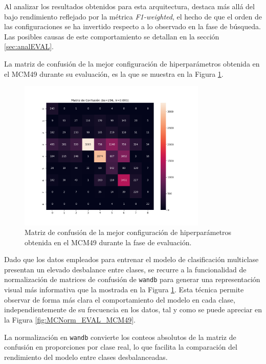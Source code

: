 Al analizar los resultados obtenidos para esta arquitectura, destaca más allá del bajo rendimiento reflejado por la métrica \textit{F1-weighted}, el hecho de que el orden de las configuraciones se ha invertido respecto a lo observado en la fase de búsqueda. Las posibles causas de este comportamiento se detallan en la sección \ref{sec:analEVAL}.



La matriz de confusión de la mejor configuración de hiperparámetros obtenida en el MCM49 durante su evaluación, es la que se muestra en la Figura \ref{fig:MC_EVAL_MCM49}.

\begin{figure}[H]
    \centering
    \includegraphics[width=0.8\textwidth]{./img/evaluacion/matrices_confusion/MC_EVAL_MCM49.png}
    \caption{Matriz de confusión de la mejor configuración de hiperparámetros obtenida en el MCM49 durante la fase de evaluación.}
    \label{fig:MC_EVAL_MCM49}
\end{figure}

Dado que los datos empleados para entrenar el modelo de clasificación multiclase presentan un elevado desbalance entre clases, se recurre a la funcionalidad de normalización de matrices de confusión de \texttt{wandb} para generar una representación visual más informativa que la mostrada en la Figura \ref{fig:MC_EVAL_MCM49}. Esta técnica permite observar de forma más clara el comportamiento del modelo en cada clase, independientemente de su frecuencia en los datos, tal y como se puede apreciar en la Figura \ref{fig:MCNorm_EVAL_MCM49}.

La normalización en \texttt{wandb} convierte los conteos absolutos de la matriz de confusión en proporciones por clase real, lo que facilita la comparación del rendimiento del modelo entre clases desbalanceadas.

